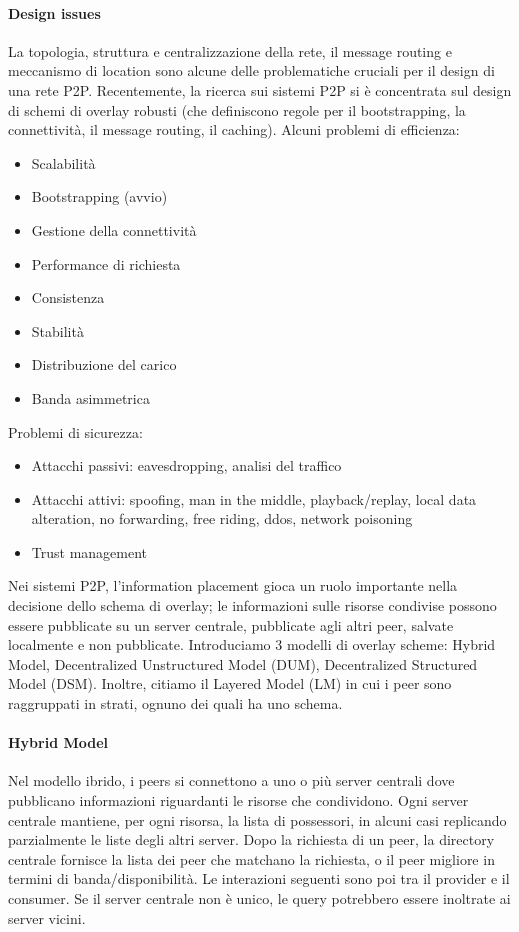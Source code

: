 \documentclass[11pt]{article}
\begin{document}
\paragraph{Design issues} La topologia, struttura e centralizzazione della rete, il message routing e meccanismo di location sono alcune delle problematiche cruciali per il design di una rete P2P. Recentemente, la ricerca sui sistemi P2P si è concentrata sul design di schemi di overlay robusti (che definiscono regole per il bootstrapping, la connettività, il message routing, il caching). Alcuni problemi di efficienza:
\begin{itemize}
    \item Scalabilità
    \item Bootstrapping (avvio)
    \item Gestione della connettività
    \item Performance di richiesta
    \item Consistenza 
    \item Stabilità
    \item Distribuzione del carico 
    \item Banda asimmetrica
\end{itemize}
Problemi di sicurezza:\begin{itemize}
    \item Attacchi passivi: eavesdropping, analisi del traffico
    \item Attacchi attivi: spoofing, man in the middle, playback/replay, local data alteration, no forwarding, free riding, ddos, network poisoning
    \item Trust management
\end{itemize}
Nei sistemi P2P, l'information placement gioca un ruolo importante nella decisione dello schema di overlay; le informazioni sulle risorse condivise possono essere pubblicate su un server centrale, pubblicate agli altri peer, salvate localmente e non pubblicate. Introduciamo 3 modelli di overlay scheme: Hybrid Model, Decentralized Unstructured Model (DUM), Decentralized Structured Model (DSM). Inoltre, citiamo il Layered Model (LM) in cui i peer sono raggruppati in strati, ognuno dei quali ha uno schema. 
\paragraph{Hybrid Model} Nel modello ibrido, i peers si connettono a uno o più server centrali dove pubblicano informazioni riguardanti le risorse che condividono. Ogni server centrale mantiene, per ogni risorsa, la lista di possessori, in alcuni casi replicando parzialmente le liste degli altri server. Dopo la richiesta di un peer, la directory centrale fornisce la lista dei peer che matchano la richiesta, o il peer migliore in termini di banda/disponibilità. Le interazioni seguenti sono poi tra il provider e il consumer. Se il server centrale non è unico, le query potrebbero essere inoltrate ai server vicini. 
\end{document}
